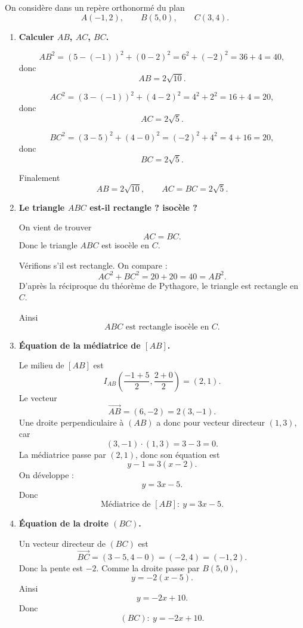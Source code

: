 \documentclass[11pt,a4paper]{article}
\newcommand{\vv}[1]{\overrightarrow{#1}}
\begin{document}
On considère dans un repère orthonormé du plan
\[
A(-1,2),\qquad B(5,0),\qquad C(3,4).
\]

\begin{enumerate}[label=\textbf{\arabic*.}]
    \item \textbf{Calculer \(AB\), \(AC\), \(BC\).}

    \[
    AB^2=(5-(-1))^2+(0-2)^2=6^2+(-2)^2=36+4=40,
    \]
    donc
    \[
    AB=2\sqrt{10}.
    \]

    \[
    AC^2=(3-(-1))^2+(4-2)^2=4^2+2^2=16+4=20,
    \]
    donc
    \[
    AC=2\sqrt5.
    \]

    \[
    BC^2=(3-5)^2+(4-0)^2=(-2)^2+4^2=4+16=20,
    \]
    donc
    \[
    BC=2\sqrt5.
    \]

    Finalement
    \[
    \boxed{AB=2\sqrt{10},\qquad AC=BC=2\sqrt5.}
    \]

    \item \textbf{Le triangle \(ABC\) est-il rectangle ? isocèle ?}

    On vient de trouver
    \[
    AC=BC.
    \]
    Donc le triangle \(ABC\) est isocèle en \(C\).

    Vérifions s'il est rectangle. On compare :
    \[
    AC^2+BC^2=20+20=40=AB^2.
    \]
    D'après la réciproque du théorème de Pythagore, le triangle est rectangle en \(C\).

    Ainsi
    \[
    \boxed{ABC \text{ est rectangle isocèle en } C.}
    \]

    \item \textbf{Équation de la médiatrice de \([AB]\).}

    Le milieu de \([AB]\) est
    \[
    I_{AB}\left(\frac{-1+5}{2},\frac{2+0}{2}\right)=(2,1).
    \]
    Le vecteur
    \[
    \vv{AB}=(6,-2)=2(3,-1).
    \]
    Une droite perpendiculaire à \((AB)\) a donc pour vecteur directeur \((1,3)\), car
    \[
    (3,-1)\cdot(1,3)=3-3=0.
    \]
    La médiatrice passe par \((2,1)\), donc son équation est
    \[
    y-1=3(x-2).
    \]
    On développe :
    \[
    y=3x-5.
    \]
    Donc
    \[
    \boxed{\text{Médiatrice de }[AB] :\ y=3x-5.}
    \]

    \item \textbf{Équation de la droite \((BC)\).}

    Un vecteur directeur de \((BC)\) est
    \[
    \vv{BC}=(3-5,4-0)=(-2,4)=(-1,2).
    \]
    Donc la pente est \(-2\). Comme la droite passe par \(B(5,0)\),
    \[
    y=-2(x-5).
    \]
    Ainsi
    \[
    y=-2x+10.
    \]
    Donc
    \[
    \boxed{(BC):\ y=-2x+10.}
    \]


\end{enumerate}
\end{document}
